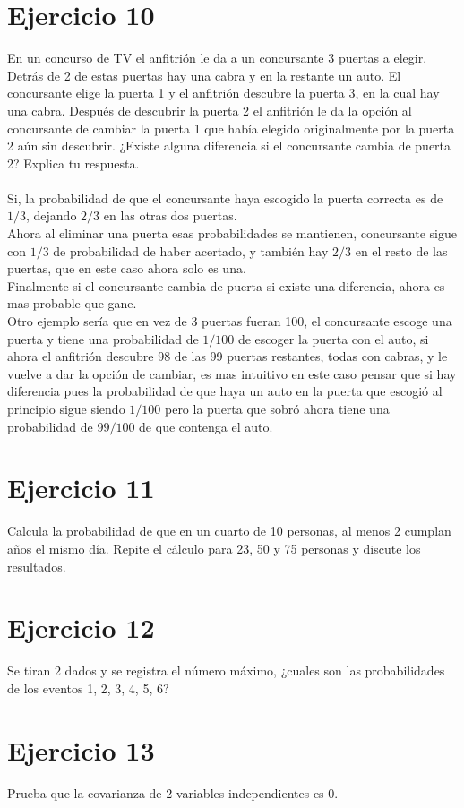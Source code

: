 \documentclass[12pt]{article}
\begin{document}
\section{Ejercicio 10}
En un concurso de TV el anfitrión le da a un concursante 3 puertas a elegir. Detrás de 2 de
estas puertas hay una cabra y en la restante un auto. El concursante elige la puerta 1 y el
anfitrión descubre la puerta 3, en la cual hay una cabra. Después de descubrir la puerta 2 el
anfitrión le da la opción al concursante de cambiar la puerta 1 que había elegido originalmente
por la puerta 2 aún sin descubrir. ¿Existe alguna diferencia si el concursante cambia de puerta
2? Explica tu respuesta.
\paragraph{} Si, la probabilidad de que el concursante haya escogido la puerta correcta es de $1/3$, dejando $2/3$ en las otras dos puertas.\\ Ahora al eliminar una puerta esas probabilidades se mantienen, concursante sigue con $1/3$ de probabilidad de haber acertado, y también hay $2/3$ en el resto de las puertas, que en este caso ahora solo es una.\\
Finalmente si el concursante cambia de puerta si existe una diferencia, ahora es mas probable que gane.\\
Otro ejemplo sería que en vez de 3 puertas fueran 100, el concursante escoge una puerta y tiene una probabilidad de $1/100$ de escoger la puerta con el auto, si ahora el anfitrión descubre 98 de las 99 puertas restantes, todas con cabras, y le vuelve a dar la opción de cambiar, es mas intuitivo en este caso pensar que si hay diferencia pues la probabilidad de que haya un auto en la puerta que escogió al principio sigue siendo $1/100$ pero la puerta que sobró ahora tiene una probabilidad de $99/100$ de que contenga el auto.
\section{Ejercicio 11}
Calcula la probabilidad de que en un cuarto de 10 personas, al menos 2 cumplan años el
mismo día. Repite el cálculo para 23, 50 y 75 personas y discute los resultados.
\section{Ejercicio 12}
Se tiran 2 dados y se registra el número máximo, ¿cuales son las probabilidades de los eventos
1, 2, 3, 4, 5, 6?
\section{Ejercicio 13}
 Prueba que la covarianza de 2 variables independientes es 0.
\end{document}
